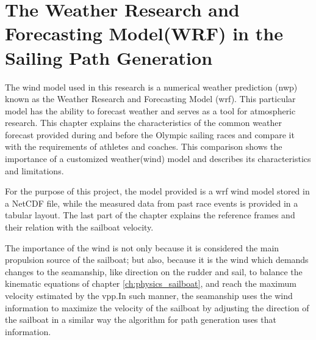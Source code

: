 
\chapter{The Weather Research and Forecasting Model(WRF) in the Sailing Path Generation} \label{ch:weatherModel} 

The wind model used in this research is a numerical weather prediction (\acrshort{nwp}) known as the Weather Research and Forecasting Model (\acrshort{wrf}). This particular model has the ability to forecast weather and serves as a tool for atmospheric research. This chapter explains the characteristics of the common weather forecast provided during and before the Olympic sailing races and compare it with the requirements of athletes and coaches. This comparison shows the importance of a customized weather(wind) model and describes its characteristics and limitations. \par \noindent 

For the purpose of this project, the model provided is a \acrshort{wrf} wind model stored in a NetCDF file, while the measured data from past race events is provided in a tabular layout. The last part of the chapter explains the reference frames and their relation with the sailboat velocity.\par

The importance of the wind is not only because it is considered the main propulsion source of the sailboat; but also, because it is the wind which demands changes to the seamanship, like direction on the rudder and sail, to balance the kinematic equations of chapter \ref{ch:physics_sailboat}, and reach the maximum velocity  estimated by the \acrshort{vpp}.In such manner, the seamanship uses the wind information to maximize the velocity of the sailboat by adjusting the direction of the sailboat in a similar way the algorithm for path generation uses that information. \par


